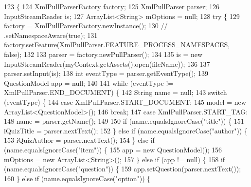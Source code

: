 \begin{DoxyCode}
123                                                                    \{
124         XmlPullParserFactory factory;
125         XmlPullParser parser;
126         InputStreamReader is;
127         ArrayList<String> mOptions = null;
128         \textcolor{keywordflow}{try} \{
129             factory = XmlPullParserFactory.newInstance();
130             \textcolor{comment}{// .setNamespaceAware(true);}
131             factory.setFeature(XmlPullParser.FEATURE\_PROCESS\_NAMESPACES, \textcolor{keyword}{false});
132 
133             parser = factory.newPullParser();
134 
135             is = \textcolor{keyword}{new} InputStreamReader(myContext.getAssets().open(fileName));
136 
137             parser.setInput(is);
138             \textcolor{keywordtype}{int} eventType = parser.getEventType();
139             QuestionModel app = null;
140 
141             \textcolor{keywordflow}{while} (eventType != XmlPullParser.END\_DOCUMENT) \{
142                 String name = null;
143                 \textcolor{keywordflow}{switch} (eventType) \{
144                     \textcolor{keywordflow}{case} XmlPullParser.START\_DOCUMENT:
145                         model = \textcolor{keyword}{new} ArrayList<QuestionModel>();
146                         \textcolor{keywordflow}{break};
147                     \textcolor{keywordflow}{case} XmlPullParser.START\_TAG:
148                         name = parser.getName();
149 
150                         \textcolor{keywordflow}{if} (name.equalsIgnoreCase(\textcolor{stringliteral}{"title"})) \{
151                             iQuizTitle = parser.nextText();
152                         \} \textcolor{keywordflow}{else} \textcolor{keywordflow}{if} (name.equalsIgnoreCase(\textcolor{stringliteral}{"author"})) \{
153                             iQuizAuthor = parser.nextText();
154                         \} \textcolor{keywordflow}{else} \textcolor{keywordflow}{if} (name.equalsIgnoreCase(\textcolor{stringliteral}{"item"})) \{
155                             app = \textcolor{keyword}{new} QuestionModel();
156                             mOptions = \textcolor{keyword}{new} ArrayList<String>();
157                         \} \textcolor{keywordflow}{else} \textcolor{keywordflow}{if} (app != null) \{
158                             \textcolor{keywordflow}{if} (name.equalsIgnoreCase(\textcolor{stringliteral}{"question"})) \{
159                                 app.setQuestion(parser.nextText());
160                             \} \textcolor{keywordflow}{else} \textcolor{keywordflow}{if} (name.equalsIgnoreCase(\textcolor{stringliteral}{"option"})) \{

\end{DoxyCode}
